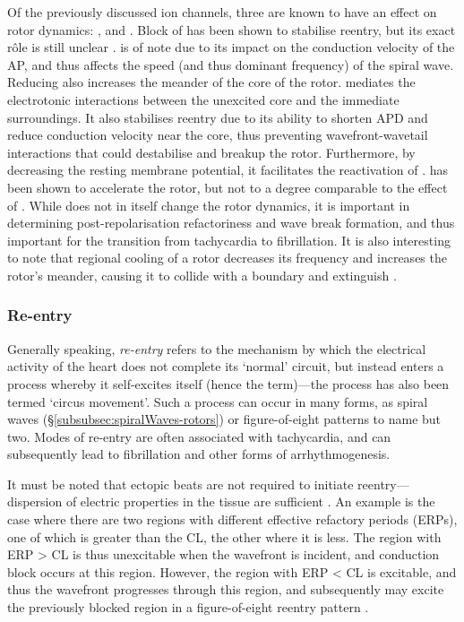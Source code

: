 \documentclass[../thesis-main.tex]{subfiles}
\begin{document}
Of the previously discussed ion channels, three are known to have an effect on rotor dynamics: \ina{}, \ikix{} and \iks{}. Block of \ica{} has been shown to stabilise reentry, but its exact r\^ole is still unclear \citep{Jalife2003, Jalife2009}. \ina{} is of note due to its impact on the conduction velocity of the AP, and thus affects the speed (and thus dominant frequency) of the spiral wave. Reducing \ina{} also increases the meander of the core of the rotor. \ikix{} mediates the electrotonic interactions between the unexcited core and the immediate surroundings. It also stabilises reentry due to its ability to shorten APD and reduce conduction velocity near the core, thus preventing wavefront-wavetail interactions that could destabilise and breakup the rotor. Furthermore, by decreasing the resting membrane potential, it facilitates the reactivation of \ina{} \citep{Pandit2013}. \ikr{} has been shown to accelerate the rotor, but not to a degree comparable to the effect of \ikix{}. While \iks{} does not in itself change the rotor dynamics, it is important in determining post-repolarisation refactoriness and wave break formation, and thus important for the transition from tachycardia to fibrillation. It is also interesting to note that regional cooling of a rotor decreases its frequency and increases the rotor's meander, causing it to collide with a boundary and extinguish \citep{Yamazaki2012}.

\subsubsection{Re-entry}
\label{subsubsec:reentry}
Generally speaking, \emph{re-entry} refers to the mechanism by which the electrical activity of the heart does not complete its `normal' circuit, but instead enters a process whereby it self-excites itself (hence the term)---the process has also been termed `circus movement'. Such a process can occur in many forms, as spiral waves (\S\ref{subsubsec:spiralWaves-rotors}) or figure-of-eight patterns \citep{Ferrero2003} to name but two. Modes of re-entry are often associated with tachycardia, and can subsequently lead to fibrillation and other forms of arrhythmogenesis.

It must be noted that ectopic beats are not required to initiate reentry---dispersion of electric properties in the tissue are sufficient \citep{Xie2007}. An example is the case where there are two regions with different effective refactory periods (ERPs), one of which is greater than the CL, the other where it is less. The region with ERP > CL is thus unexcitable when the wavefront is incident, and conduction block occurs at this region. However, the region with ERP < CL is excitable, and thus the wavefront progresses through this region, and subsequently may excite the previously blocked region in a figure-of-eight reentry pattern \citep{Weiss2006}.

\biblio
\end{document}
